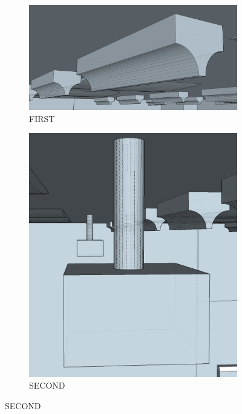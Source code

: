\documentclass[../../main.tex]{subfiles}
\begin{document}
			\begin{figure}[ht]
				\begin{subfigure}[t]{4in}
					\centering
					\includegraphics[scale = 0.25]{Sections/Implementation/Modelling/images/lights2.png}
					\caption{FIRST}
				\end{subfigure}
				\begin{subfigure}[t]{3in}
					\centering
					\includegraphics[scale = 0.25]{Sections/Implementation/Modelling/images/projector1.png}
					\caption{SECOND}
				\end{subfigure}

\end{figure}
\end{document}
